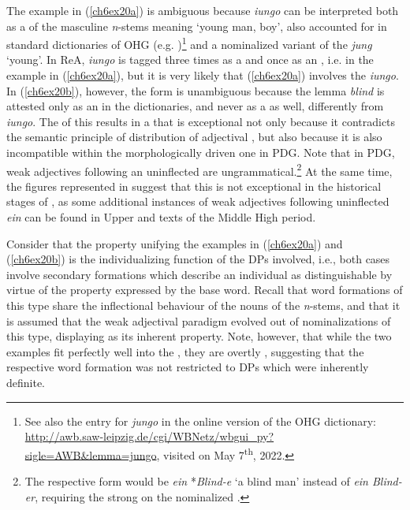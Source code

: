 \documentclass[output=paper,colorlinks,citecolor=brown]{langscibook}
\begin{document}
The example in (\ref{ch6ex20a}) is ambiguous because \emph{iungo} can be
interpreted both as a  of the masculine \emph{n}-stems meaning
`young man, boy', also accounted for in standard dictionaries of OHG
(e.g. \citealp[170]{Schutzeichel12})\footnote{See also the entry for
  \emph{jungo} in the online version of the OHG dictionary:
  \url{http://awb.saw-leipzig.de/cgi/WBNetz/wbgui\_py?sigle=AWB\&lemma=jungo},
  visited on May 7\textsuperscript{th}, 2022.} and a nominalized variant
of the  \emph{jung} `young'. In ReA, \emph{iungo} is tagged
three times as a  and once as an , i.e. in the example in (\ref{ch6ex20a}), but it is very likely that (\ref{ch6ex20a}) involves the  \emph{iungo}. In (\ref{ch6ex20b}),
however, the form is unambiguous because the lemma \emph{blind} is
attested only as an  in the dictionaries, and never as a 
as well, differently from \emph{iungo}. The  of this
 results in a  that is exceptional not only because it
contradicts the semantic principle of distribution of adjectival
, but also because it is also incompatible within the
morphologically driven one in PDG. Note that in PDG, weak adjectives
following an uninflected   are
ungrammatical.\footnote{The respective form would be \emph{ein}
  *\emph{Blind-e} `a blind man' instead of \emph{ein Blind-er},
  requiring the strong  on the nominalized .} At the
same time, the figures represented in \citet[202]{klein2007semantischen} suggest that
this  is not exceptional in the historical stages of , as
some additional instances of weak adjectives following uninflected
\emph{ein} can be found in Upper and  texts of the Middle
High  period.

Consider that the property unifying the examples in (\ref{ch6ex20a}) and (\ref{ch6ex20b}) is the
individualizing function of the DPs involved, i.e., both cases involve
secondary formations which describe an individual as distinguishable by
virtue of the property expressed by the base word. Recall that word
formations of this type share the inflectional behaviour of the nouns of
the \emph{n}-stems, and that it is assumed that the weak adjectival
paradigm evolved out of nominalizations of this type, displaying
 as its inherent property. Note, however, that while the two
examples fit perfectly well into the  , they are
overtly , suggesting that the respective word formation
 was not restricted to DPs which were inherently definite.
\end{document}

